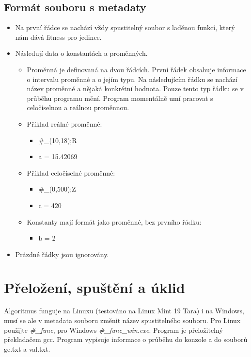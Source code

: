 \documentclass{article}
\begin{document}
\subsection{Formát souboru s metadaty}
\begin{itemize}
\item Na první řádce se nachází vždy spustitelný soubor s laděnou funkcí, který nám dává fitness pro jedince.
\item Následují data o konstantách a proměnných.
\begin{itemize}
\item Proměnná je definovaná na dvou řádcích. První řádek obsahuje informace o intervalu proměnné a o jejím typu. Na následujícím řádku se nachází název proměnné a nějaká konkrétní hodnota. Pouze tento typ řádku se v průběhu programu mění. Program momentálně umí pracovat s celočíselnou a reálnou proměnnou. 
\item Příklad reálné proměnné: \ 
\begin{itemize}
\item \#\_(10,18);R
\item a = 15.42069
\end{itemize}
\item Příklad celočíselné proměnné:
\begin{itemize}
\item \#\_(0,500);Z
\item c = 420
\end{itemize}
\item Konstanty mají formát jako proměnné, bez prvního řádku:
\begin{itemize}
\item b = 2
\end{itemize}
\end{itemize}
\item Prázdné řádky jsou ignorovány.
\end{itemize}

\section{Přeložení, spuštění a úklid}
Algoritmus funguje na Linuxu (testováno na Linux Mint 19 Tara) i na Windows, musí se ale v metadata souboru změnit název spustitelného souboru. Pro Linux použijte \textit{\#\_func}, pro Windows \textit{\#\_func\_win.exe}. Program je přeložitelný překladačem gcc. Program vypisuje informace o průběhu do konzole a do souborů ge.txt a val.txt.
\end{document}
